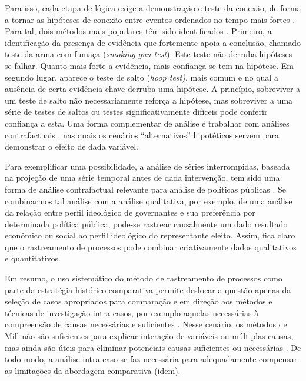 Para isso, cada etapa de lógica exige a demonstração e teste da
conexão, de forma a tornar as hipóteses de conexão entre eventos
ordenados no tempo mais fortes \citep{mahoney_process_2015}. Para tal,
dois métodos mais populares têm sido identificados
\citep{mahoney_process_2015}. Primeiro, a identificação da presença de
evidência que fortemente apoia a conclusão, chamado teste da arma com
fumaça (\emph{smoking gun test}). Este teste não derruba hipóteses se
falhar. Quanto mais forte a evidência, mais confiança se tem na
hipótese. Em segundo lugar, aparece o teste de salto (\emph{hoop test)},
mais comum e no qual a ausência de certa evidência-chave derruba uma
hipótese. A princípio, sobreviver a um teste de salto não
necessariamente reforça a hipótese, mas sobreviver a uma série de
testes de saltos ou testes significativamente difíceis pode conferir
confiança a esta. Uma forma complementar de análise é trabalhar com
análises contrafactuais \citep{mahoney_comparative-historical_2004}, nas
quais os cenários ``alternativos'' hipotéticos servem para demonstrar o
efeito de dada variável.

Para exemplificar uma possibilidade, a análise de séries interrompidas,
baseada na projeção de uma série temporal antes de dada intervenção,
tem sido uma forma de análise contrafactual relevante para análise de
políticas públicas . Se combinarmos tal análise
com a análise qualitativa, por exemplo, de uma análise da relação entre
perfil ideológico de governantes e sua preferência por determinada
política pública, pode-se rastrear causalmente um dado resultado
econômico ou social ao perfil ideológico do representante eleito.
Assim, fica claro que o rastreamento de processos pode combinar
criativamente dados qualitativos e quantitativos.

Em resumo, o uso sistemático do método de rastreamento de processos
como parte da estratégia histórico-comparativa permite deslocar a
questão apenas da seleção de casos apropriados para comparação e em
direção aos métodos e técnicas de investigação intra casos, por exemplo
aquelas necessárias à compreensão de causas necessárias e suficientes
\citep{mahoney_strategies_2003,mahoney_comparative-historical_2004}.
Nesse cenário, os métodos de Mill não são suficientes para explicar
interação de variáveis ou múltiplas causas, mas ainda são úteis para
eliminar potenciais causas suficientes ou necessárias
\citep{mahoney_comparative-historical_2004}. De todo modo, a análise
intra caso se faz necessária para adequadamente compensar as
limitações da abordagem comparativa (idem).

